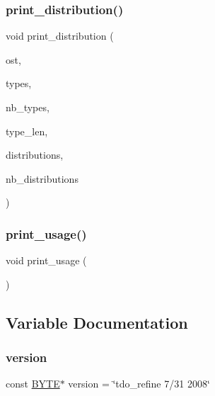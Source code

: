 \subsubsection{\texorpdfstring{print\+\_\+distribution()}{print\_distribution()}}
{\footnotesize\ttfamily void print\+\_\+distribution (\begin{DoxyParamCaption}\item[{ostream \&}]{ost,  }\item[{\mbox{\hyperlink{galois_8h_a09fddde158a3a20bd2dcadb609de11dc}{I\+NT}} $\ast$}]{types,  }\item[{\mbox{\hyperlink{galois_8h_a09fddde158a3a20bd2dcadb609de11dc}{I\+NT}}}]{nb\+\_\+types,  }\item[{\mbox{\hyperlink{galois_8h_a09fddde158a3a20bd2dcadb609de11dc}{I\+NT}}}]{type\+\_\+len,  }\item[{\mbox{\hyperlink{galois_8h_a09fddde158a3a20bd2dcadb609de11dc}{I\+NT}} $\ast$}]{distributions,  }\item[{\mbox{\hyperlink{galois_8h_a09fddde158a3a20bd2dcadb609de11dc}{I\+NT}}}]{nb\+\_\+distributions }\end{DoxyParamCaption})}

\mbox{\label{tdo__refine_8_c_ae5ad5cbeccaedc03a48d3c7eaa803e79}} 
\subsubsection{\texorpdfstring{print\+\_\+usage()}{print\_usage()}}
{\footnotesize\ttfamily void print\+\_\+usage (\begin{DoxyParamCaption}{ }\end{DoxyParamCaption})}



\subsection{Variable Documentation}
\mbox{\label{tdo__refine_8_c_a0f1d0e4d3d22d72be50dfaa5f7f59b72}} 
\subsubsection{\texorpdfstring{version}{version}}
{\footnotesize\ttfamily const \mbox{\hyperlink{galois_8h_ab6cc7b4aeb6ea31aba2b3fbfc83ff5e6}{B\+Y\+TE}}$\ast$ version = \char`\"{}tdo\+\_\+refine 7/31 2008\char`\"{}}

